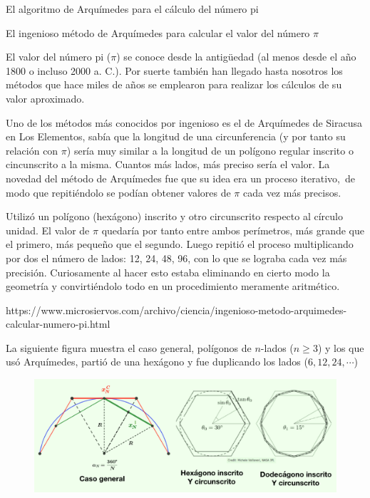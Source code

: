 \vspace{2cm}

\begin{myexampleblock}{El algoritmo de Arquímedes para el cálculo del número pi}


\small{El ingenioso método de Arquímedes para calcular el valor del número $\pi$}

\vspace{2mm}\small{El valor del número pi ($\pi$) se conoce desde la antigüedad (al menos desde el año 1800 o incluso 2000 a. C.). Por suerte también han llegado hasta nosotros los métodos que hace miles de años se emplearon para realizar los cálculos de su valor aproximado.}

\vspace{2mm}\small{Uno de los métodos más conocidos por ingenioso es el de Arquímedes de Siracusa en Los Elementos, sabía que la longitud de una circunferencia (y por tanto su relación con $\pi$) sería muy similar a la longitud de un polígono regular inscrito o cincunscrito a la misma. Cuantos más lados, más preciso sería el valor. La novedad del método de Arquímedes fue que su idea era un proceso iterativo, de modo que repitiéndolo se podían obtener valores de $\pi$ cada vez más precisos.}

\vspace{2mm}\small{Utilizó un polígono (hexágono) inscrito y otro circunscrito respecto al círculo unidad. El valor de $\pi$ quedaría por tanto entre ambos perímetros, más grande que el primero, más pequeño que el segundo. Luego repitió el proceso multiplicando por dos el número de lados: 12, 24, 48, 96, con lo que se lograba cada vez más precisión. Curiosamente al hacer esto estaba eliminando en cierto modo la geometría y convirtiéndolo todo en un procedimiento meramente aritmético.}

\vspace{2mm}\footnotesize{https://www.microsiervos.com/archivo/ciencia/ingenioso-metodo-arquimedes-calcular-numero-pi.html}


\small{La siguiente figura muestra el caso general, polígonos de $n$-lados ($n\ge 3$) y los que usó Arquímedes, partió de una hexágono y fue duplicando los lados ($6,12,24,\cdots $)}

	\begin{figure}[H]
		\centering
		\includegraphics[width=1\textwidth]{img-ft/T01IM26.png}
	\end{figure}
	

\end{myexampleblock}
